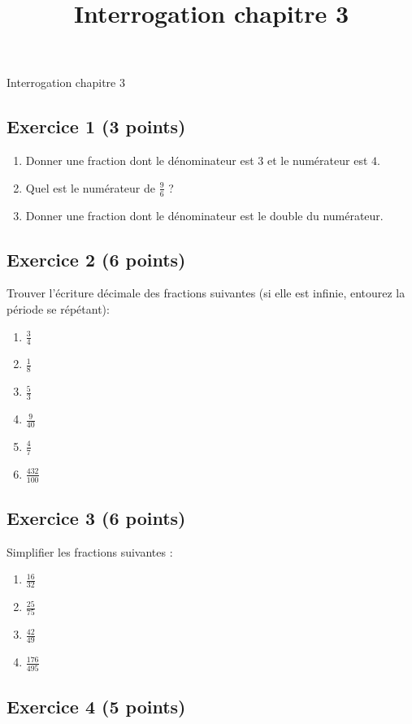 \documentclass[14 pt]{extarticle}
\title{Interrogation chapitre 3}
\date{}
\theoremstyle{plain}
\begin{document}
\begin{center}{\Large Interrogation chapitre 3}\\ 
 \end{center}
 \subsection*{Exercice 1 (3 points)}
 
 \begin{enumerate}
 \item Donner une fraction dont le dénominateur est $3$ et le numérateur est $4$. 
 \item Quel est le numérateur de $\frac96$ ?
 \item Donner une fraction dont le dénominateur est le double du numérateur. 
 \end{enumerate}
 
 \subsection*{Exercice 2 (6 points)}
Trouver l'écriture décimale des fractions suivantes (si elle est infinie, entourez la période se répétant): 
\begin{enumerate}
\item $\frac34$
\item $\frac18$
\item $\frac53$
\item $\frac{9}{40}$
\item $\frac47$
\item $\frac{432}{100}$
\end{enumerate}
 \subsection*{Exercice 3 (6 points)}
 
 Simplifier les fractions suivantes : 
 \begin{enumerate}
 \item $\frac{16}{32}$
 \item $\frac{25}{75}$
 \item $\frac{42}{49}$
 \item $\frac{176}{495}$
 \end{enumerate}
 
 
 \subsection*{Exercice 4 (5 points)}
 
\end{document}
